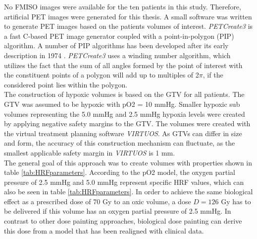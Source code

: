 No FMISO images were available for the ten patients in this study. Therefore, artificial PET images were generated for this thesis. A small software was written to generate PET images based on the patients volumes of interest. \textit{PETCreate3} is a fast C-based PET image generator coupled with a point-in-polygon (PIP) algorithm. A number of PIP algorithms has been developed after its early description in 1974 \cite{Sutherland}. \textit{PETCreate3} uses a winding number algorithm, which utilizes the fact that the sum of all angles formed by the point of interest with the constituent points of a polygon will add up to multiples of 2$\pi$, if the considered point lies within the polygon.\\The construction of hypoxic volumes is based on the GTV for all patients. The GTV was assumed to be hypoxic with  pO2 = 10 mmHg. Smaller hypoxic sub volumes representing the 5.0 mmHg and 2.5 mmHg hypoxia levels were created by applying negative safety margins to the GTV. The volumes were created with the virtual treatment planning software \textit{VIRTUOS}. As GTVs can differ in size and form, the accuracy of this construction mechanism can fluctuate, as the smallest applicable safety margin in \textit{VIRTUOS} is 1 mm.\\The general goal of this approach was to create volumes with properties shown in table \ref{tab:HRFparameters}. According to the pO2 model, the oxygen partial pressure of 2.5 mmHg and 5.0 mmHg represent specific HRF values, which can also be seen in table \ref{tab:HRFparameters}. In order to achieve the same biological effect as a prescribed dose of 70 Gy to an oxic volume, a dose $D = 126$ Gy has to be delivered if this volume has an oxygen partial pressure of 2.5 mmHg. In contrast to other dose painting approaches, biological dose painting can derive this dose from a model that has been realigned with clinical data.
